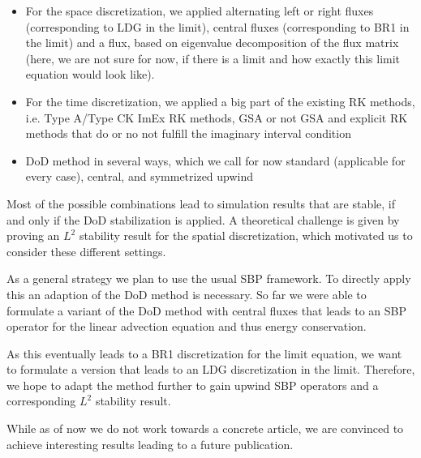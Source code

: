 \documentclass[]{article}
\begin{document}
\begin{itemize}
	\item For the space discretization, we applied alternating left or right fluxes (corresponding to LDG in the limit), central fluxes (corresponding to BR1 in the limit)
	and a flux, based on eigenvalue decomposition of the flux matrix (here, we are not sure for now, if there is a limit and how exactly this limit equation would look like).
	\item For the time discretization, we applied a big part of the existing RK methods, i.e. Type A/Type CK ImEx RK methods, GSA or not GSA and explicit RK methods
	 that do or no not fulfill the imaginary interval condition
	\item DoD method in several ways, which we call for now standard (applicable for every case), central, and symmetrized upwind
\end{itemize}
Most of the possible combinations lead to simulation results that are stable, if and only if the DoD stabilization is applied.
A theoretical challenge is given by proving an $L^2$ stability result for the  spatial discretization, which motivated us to consider these different settings.

As a general strategy we plan to use the usual SBP framework. To directly apply this an adaption of the DoD method is necessary. So far we were able to formulate a variant of the DoD method with central fluxes that leads to an SBP operator for the linear advection equation and thus energy conservation.

As this eventually leads to a BR1 discretization for the limit equation, we want to formulate a version that leads to an LDG discretization in the limit.
Therefore, we hope to adapt the method further to gain upwind SBP operators and a corresponding $L^2$ stability result.


While as of now we do not work towards a concrete article, we are convinced to achieve interesting results leading to a future publication.




\end{document}
